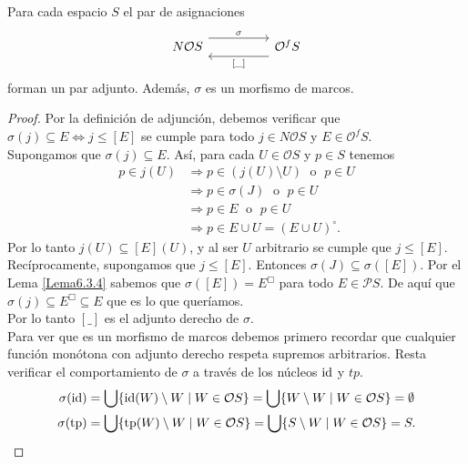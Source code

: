\begin{thm}\label{Teorema6.3.5}
    Para cada espacio $S$ el par de asignaciones 
    \[\begin{tikzcd}
	{N\mathcal{O}S} && {\mathcal{O}^fS}
	\arrow["\sigma", shift left=3, from=1-1, to=1-3]
	\arrow["{[ \_ ]}", shift left=3, from=1-3, to=1-1]
\end{tikzcd}\]
forman un par adjunto. Además, $\sigma$ es un morfismo de marcos.
\end{thm}

\begin{proof}
    Por la definición de adjunción, debemos verificar que $\sigma(j)\subseteq E\Leftrightarrow j\leq [E]$ se cumple para todo $j\in N\mathcal{O}S$ y $E\in \mathcal{O}^fS$.\\

    Supongamos que $\sigma(j)\subseteq E$. Así, para cada $U\in \mathcal{O}S$ y $p\in S$ tenemos 
    \[
    \begin{split}
        p\in j(U) &\Rightarrow  p\in (j(U)\setminus U)\;\mbox{ o }\; p\in U\\
        & \Rightarrow p\in \sigma(J) \; \mbox{ o }\; p\in U\\
        & \Rightarrow p\in E \;\mbox{ o }\; p\in U\\
        & \Rightarrow p\in E\cup U=(E\cup U)^\circ.
    \end{split}
    \]
    Por lo tanto $j(U)\subseteq [E](U)$, y al ser $U$ arbitrario se cumple que $j\leq [E]$.\\

    Recíprocamente, supongamos que $j\leq [E]$. Entonces $\sigma(J)\subseteq \sigma([E])$. Por el Lema \ref{Lema6.3.4} sabemos que $\sigma([E])=E^\Box$ para todo $E\in \mathcal{P}S$. De aquí que $\sigma(j)\subseteq E^\Box\subseteq E$ que es lo que queríamos.\\

    Por lo tanto $[ \_ ]$ es el adjunto derecho de $\sigma$.\\

    Para ver que es un morfismo de marcos debemos primero recordar que cualquier función monótona con adjunto derecho respeta supremos arbitrarios. Resta verificar el comportamiento de $\sigma$ a través de los núcleos $\mathrm{id}$ y $tp$.
    \[
    \begin{split}
    \sigma(\mathrm{id})& =\bigcup\{\mathrm{id}(W)\setminus W\mid W\in \mathcal{O}S\}=\bigcup\{W\setminus W\mid W\in \mathcal{O}S\}=\emptyset\\
    \sigma(\mathrm{tp})& =\bigcup\{\mathrm{tp}(W)\setminus W\mid W\in \mathcal{O}S\}=\bigcup\{S\setminus W\mid W\in \mathcal{O}S\}=S.
    \end{split}
    \]
\end{proof}

